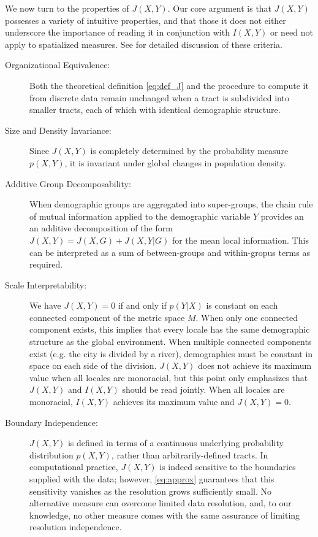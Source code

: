 	We now turn to the properties of $J(X,Y)$. Our core argument is that $J(X,Y)$ possesses a variety of intuitive properties, and that those it does not either underscore the importance of reading it in conjunction with $I(X,Y)$ or need not apply to spatialized measures.  See \cite{Reardon2002,Reardon2004} for detailed discussion of these criteria. 
	\begin{description}
		\item[Organizational Equivalence:] Both the theoretical definition \eqref{eq:def_J} and the procedure to compute it from discrete data remain unchanged when a tract is subdivided into smaller tracts, each of which with identical demographic structure. 
		\item[Size and Density Invariance:] Since $J(X,Y)$ is completely determined by the probability measure $p(X,Y)$, it is invariant under global changes in population density. 
		\item[Additive Group Decomposability:] When demographic groups are aggregated into super-groups, the chain rule of mutual information applied to the demographic variable $Y$ provides an an additive decomposition of the form $J(X,Y) = J(X,G) + J(X,Y|G)$ for the mean local information. This can be interpreted as a sum of between-groups and within-gropus terms as required. 
		\item[Scale Interpretability:] We have $J(X,Y) = 0$ if and only if $p(Y|X)$ is constant on each connected component of the metric space $M$. When only one connected component exists, this implies that every locale has the same demographic structure as the global environment. When multiple connected components exist (e.g. the city is divided by a river), demographics must be constant in space on each side of the division. $J(X,Y)$ does not achieve its maximum value when all locales are monoracial, but this point only emphasizes that $J(X,Y)$ and $I(X,Y)$ should be read jointly. When all locales are monoracial, $I(X,Y)$ achieves its maximum value and $J(X,Y) = 0$. 
		\item[Boundary Independence:] $J(X,Y)$ is defined in terms of a continuous underlying probability distribution $p(X,Y)$, rather than arbitrarily-defined tracts. In computational practice, $J(X,Y)$ is indeed sensitive to the boundaries supplied with the data; however, \eqref{eq:approx} guarantees that this sensitivity vanishes as the resolution grows sufficiently small. No alternative measure can overcome limited data resolution, and, to our knowledge, no other measure comes with the same assurance of limiting resolution independence. 

\end{description}
